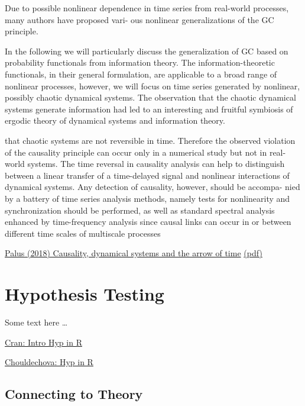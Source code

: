 \documentclass[
]{book}
\begin{document}
Due to possible nonlinear dependence in time series from
real-world processes, many authors have proposed vari-
ous nonlinear generalizations of the GC principle.

In the
following we will particularly discuss the generalization
of GC based on probability functionals from information
theory. The information-theoretic functionals, in their
general formulation, are applicable to a broad range of
nonlinear processes, however, we will focus on time
series generated by nonlinear, possibly chaotic dynamical
systems. The observation that the chaotic dynamical systems
generate information had led to an interesting and
fruitful symbiosis of ergodic theory of dynamical systems
and information theory.

that chaotic systems are not reversible in time.
Therefore the observed violation of the causality principle can
occur only in a numerical study but not in real-world
systems. The time reversal in causality analysis can help
to distinguish between a linear transfer of a time-delayed
signal and nonlinear interactions of dynamical systems.
Any detection of causality, however, should be accompa-
nied by a battery of time series analysis methods, namely
tests for nonlinearity and synchronization should be performed,
as well as standard spectral analysis enhanced by
time-frequency analysis since causal links can occur in or
between different time scales of multiscale processes

\href{https://www.researchgate.net/publication/326475420_Causality_dynamical_systems_and_the_arrow_of_time}{Palus (2018) Causality, dynamical systems and the arrow of time}
\href{pdf/Palus_2018_Causality_Dynamical_Systems_Time_Arrow.pdf}{(pdf)}

\hypertarget{hypothesis-testing}{%
\chapter{Hypothesis Testing}\label{hypothesis-testing}}

Some text here \ldots{}

\href{https://cran.r-project.org/web/packages/distributions3/vignettes/intro-to-hypothesis-testing.html}{Cran: Intro Hyp in R}

\href{https://www.andrew.cmu.edu/user/achoulde/94842/lectures/lecture07/lecture07-94842.html}{Chouldechova: Hyp in R}

\hypertarget{connecting-to-theory}{%
\section{Connecting to Theory}\label{connecting-to-theory}}
\end{document}
